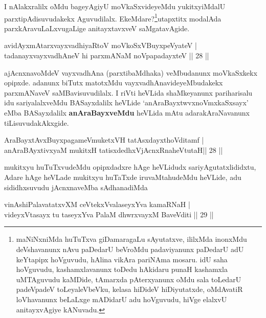 \begin{artha}
I nAlakxralilx oMdu bageyAgiyU moVkaSxvideyeMdu yukitxyiMdalU parxtipAdisuvudakekx Aguvudilalx. EkeMdare?\footnote{maNiNxniMda huTuTxva giDamaragaLu sAyutatxve, ililxMda inonxMdu deVshavanunx nAvu paDedarU beVroMdu padaviyanunx paDedarU adU keYtapipx hoVguvudu, hAlina vikAra pariNAma mosaru. idU saha hoVguvudu, kashamxlavanunx toDedu hAkidaru punaH kashamxla uMTAguvudu kaMDide, tAmarxda pAterxyanunx oMdu sala toLedarU padeVpadeV toLeyaleVbeVku, kelasa hiDideV hiDiyutatxde, oMdAvatiR loVhavanunx beLaLxge mADidarU adu hoVguvudu, hiVge elalxvU anitayxvAgiye kANuvadu.}utapxtitx modalAda parxkAravuLaLxvugaLige anitayxtavxveV saMgatavAgide.
\end{artha}

\begin{shl}
avidAyxmAtarxvayxvadhiyaRtoV moVkoSxV\s BuyxpeVyateV |\\
tadanayxvayxvadhAneV hi parxmANaM noVpapadayxteV \hfill || 28 ||
\end{shl}

\begin{artha}
ajAcnxnavoMdeV vayxvadhAna (parxtibaMdhaka) veMbudanunx moVkaSxkekx opipxde. adanunx biTutx matotxMdu vayxvadhAnavideyeMbudakekx parxmANaveV saMBavisuvudilalx. I riVti heVLida shaMkeyanunx pariharisalu idu sariyalalxveMdu BASayxdalilx heVLide `anAraBayxtwvxnoVmxkaSxsayx' eMba BASayxdalilx \textbf{anAraBayxveMdu} heVLida mAtu adarakAraNavanunx tiLisuvudakAkxgide.
\end{artha}


\begin{shl}
AraBayxtAvxBuyxpagameVmuketxVH tatAsxdayxthoVditamf |\\
anAraBAyxtivxyaM mukitxH tatisxdedhxVjAcnxRnaheVtutaH\hfill || 28 ||
\end{shl}

\begin{artha}
mukitxyu huTuTxvudeMdu opipxdadxre hAge heVLidudx sariyAgutatxlididxtu, Adare hAge heVLade mukitxyu huTaTxde iruvaMtahudeMdu heVLide, adu sididhxsuvudu jAcnxnaveMba sAdhanadiMda
\end{artha}


\begin{shl}
vinAshiPalavatatxvXM ceVtekxVvalaseyxYva kamaRNaH |\\
videyxVtasayx tu taseyxYva PalaM dhwrxvayxM BaveVditi \hfill || 29 ||
\end{shl}


